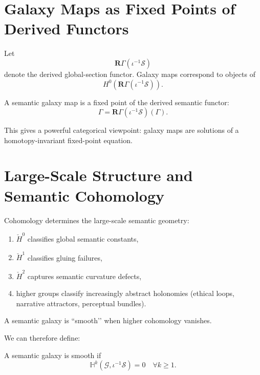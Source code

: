 \section{Galaxy Maps as Fixed Points of Derived Functors}

Let
\[
  \mathbf{R}\Gamma(\iota^{-1}\mathscr{S})
\]
denote the derived global-section functor.
Galaxy maps correspond to objects of
\[
  H^0(\mathbf{R}\Gamma(\iota^{-1}\mathscr{S})).
\]

\begin{theorem}
A semantic galaxy map is a fixed point of the derived semantic functor:
\[
  \Gamma
  =
  \mathbf{R}\Gamma(\iota^{-1}\mathscr{S})(\Gamma).
\]
\end{theorem}

This gives a powerful categorical viewpoint:
galaxy maps are solutions of a homotopy-invariant fixed-point equation.

\section{Large-Scale Structure and Semantic Cohomology}

Cohomology determines the large-scale semantic geometry:

\begin{enumerate}
  \item $\check{H}^0$ classifies global semantic constants,  
  \item $\check{H}^1$ classifies gluing failures,  
  \item $\check{H}^2$ captures semantic curvature defects,  
  \item higher groups classify increasingly abstract holonomies  
        (ethical loops, narrative attractors, perceptual bundles).
\end{enumerate}

A semantic galaxy is “smooth’’ when higher cohomology vanishes.

We can therefore define:

\begin{definition}
A semantic galaxy is smooth if  
\[
  \mathbb{H}^k(\mathcal{G},\iota^{-1}\mathscr{S})=0
  \quad\forall k\ge 1.
\]
\end{definition}

